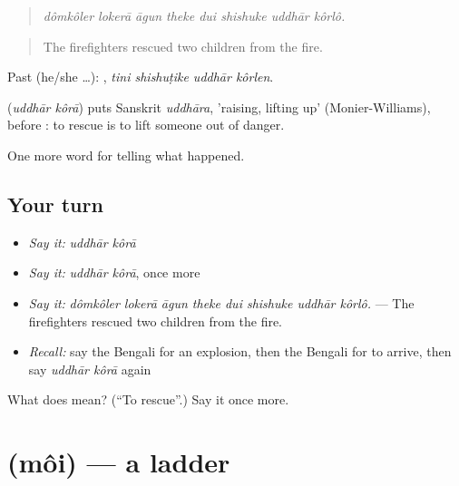 \begin{quote}
       
\end{quote}

\begin{quote}
\emph{dômkôler lokerā āgun theke dui shishuke uddhār kôrlô.}
\end{quote}

\begin{quote}
The firefighters rescued two children from the fire.
\end{quote}

Past (he/she …):    , \emph{tini shishuṭike uddhār kôrlen}.

\begin{cousinweb}
\textbf{ } (\emph{uddhār kôrā}) puts Sanskrit \emph{uddhāra}, 'raising, lifting up' (Monier-Williams), before : to rescue is to lift someone out of danger.
\end{cousinweb}

\begin{grammarlens}[title={What you've built}]
One more word for telling what happened.
\end{grammarlens}

\subsection*{Your turn}
\begin{itemize}
\raggedright
  \item \emph{Say it:} \emph{uddhār kôrā}
  \item \emph{Say it:} \emph{uddhār kôrā}, once more
  \item \emph{Say it:} \emph{dômkôler lokerā āgun theke dui shishuke uddhār kôrlô.} — The firefighters rescued two children from the fire.
  \item \emph{Recall:} say the Bengali for an explosion, then the Bengali for to arrive, then say \emph{uddhār kôrā} again
\end{itemize}

\begin{tcolorbox}[breakable,colback=teal!4,colframe=teal!35!black,title={Before you move on}]
What does   mean? (\textquotedblleft{}To rescue\textquotedblright{}.) Say it once more.
\end{tcolorbox}
\section[\texorpdfstring{\bn{মই} (môi)}{মই (môi)}]{ (môi) — a ladder}

